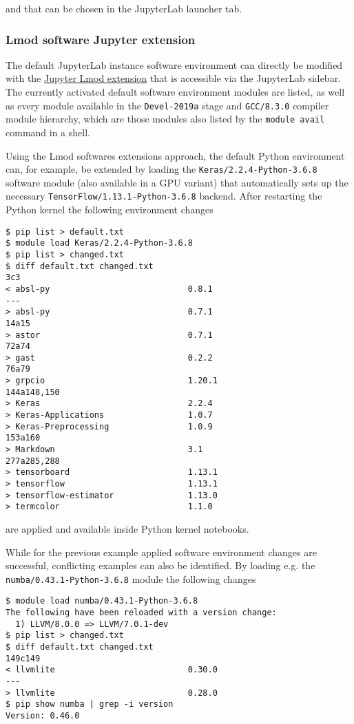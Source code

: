 \documentclass[11pt,a4paper]{article}
\begin{document}
and that can be chosen in the JupyterLab launcher tab.

\subsubsection{Lmod software Jupyter extension}

The default JupyterLab instance software environment can directly be modified with the \href{https://github.com/cmd-ntrf/jupyter-lmod}{Jupyter Lmod extension} that is accessible via the JupyterLab sidebar.
The currently activated default software environment modules are listed, as well as every module available in the \verb|Devel-2019a| stage and \verb|GCC/8.3.0| compiler module hierarchy, which are those modules also listed by the \verb|module avail| command in a shell.

Using the Lmod softwares extensions approach, the default Python environment can, for example, be extended by loading the \verb|Keras/2.2.4-Python-3.6.8| software module (also available in a GPU variant) that automatically sets up the necessary \verb|TensorFlow/1.13.1-Python-3.6.8| backend. After restarting the Python kernel the following environment changes

\begin{verbatim}
$ pip list > default.txt
$ module load Keras/2.2.4-Python-3.6.8
$ pip list > changed.txt
$ diff default.txt changed.txt
3c3
< absl-py                            0.8.1
---
> absl-py                            0.7.1
14a15
> astor                              0.7.1
72a74
> gast                               0.2.2
76a79
> grpcio                             1.20.1
144a148,150
> Keras                              2.2.4
> Keras-Applications                 1.0.7
> Keras-Preprocessing                1.0.9
153a160
> Markdown                           3.1
277a285,288
> tensorboard                        1.13.1
> tensorflow                         1.13.1
> tensorflow-estimator               1.13.0
> termcolor                          1.1.0
\end{verbatim}

are applied and available inside Python kernel notebooks.

While for the previous example applied software environment changes are successful, conflicting examples can also be identified.
By loading e.g. the \verb|numba/0.43.1-Python-3.6.8| module the following changes

\begin{verbatim}
$ module load numba/0.43.1-Python-3.6.8
The following have been reloaded with a version change:
  1) LLVM/8.0.0 => LLVM/7.0.1-dev
$ pip list > changed.txt
$ diff default.txt changed.txt
149c149
< llvmlite                           0.30.0
---
> llvmlite                           0.28.0
$ pip show numba | grep -i version
Version: 0.46.0
\end{verbatim}
\end{document}
